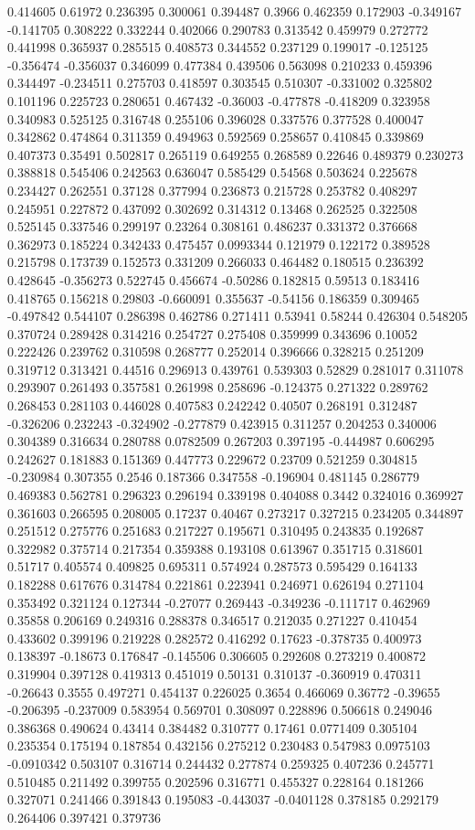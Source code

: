 0.414605 0.61972 0.236395 0.300061 0.394487 0.3966 0.462359 0.172903 -0.349167 -0.141705 0.308222 0.332244 0.402066 0.290783 0.313542 0.459979 0.272772 0.441998 0.365937 0.285515 0.408573 0.344552 0.237129 0.199017 -0.125125 -0.356474 -0.356037 0.346099 0.477384 0.439506 0.563098 0.210233 0.459396 0.344497 -0.234511 0.275703 0.418597 0.303545 0.510307 -0.331002 0.325802 0.101196 0.225723 0.280651 0.467432 -0.36003 -0.477878 -0.418209 0.323958 0.340983 0.525125 0.316748 0.255106 0.396028 0.337576 0.377528 0.400047 0.342862 0.474864 0.311359 0.494963 0.592569 0.258657 0.410845 0.339869 0.407373 0.35491 0.502817 0.265119 0.649255 0.268589 0.22646 0.489379 0.230273 0.388818 0.545406 0.242563 0.636047 0.585429 0.54568 0.503624 0.225678 0.234427 0.262551 0.37128 0.377994 0.236873 0.215728 0.253782 0.408297 0.245951 0.227872 0.437092 0.302692 0.314312 0.13468 0.262525 0.322508 0.525145 0.337546 0.299197 0.23264 0.308161 0.486237 0.331372 0.376668 0.362973 0.185224 0.342433 0.475457 0.0993344 0.121979 0.122172 0.389528 0.215798 0.173739 0.152573 0.331209 0.266033 0.464482 0.180515 0.236392 0.428645 -0.356273 0.522745 0.456674 -0.50286 0.182815 0.59513 0.183416 0.418765 0.156218 0.29803 -0.660091 0.355637 -0.54156 0.186359 0.309465 -0.497842 0.544107 0.286398 0.462786 0.271411 0.53941 0.58244 0.426304 0.548205 0.370724 0.289428 0.314216 0.254727 0.275408 0.359999 0.343696 0.10052 0.222426 0.239762 0.310598 0.268777 0.252014 0.396666 0.328215 0.251209 0.319712 0.313421 0.44516 0.296913 0.439761 0.539303 0.52829 0.281017 0.311078 0.293907 0.261493 0.357581 0.261998 0.258696 -0.124375 0.271322 0.289762 0.268453 0.281103 0.446028 0.407583 0.242242 0.40507 0.268191 0.312487 -0.326206 0.232243 -0.324902 -0.277879 0.423915 0.311257 0.204253 0.340006 0.304389 0.316634 0.280788 0.0782509 0.267203 0.397195 -0.444987 0.606295 0.242627 0.181883 0.151369 0.447773 0.229672 0.23709 0.521259 0.304815 -0.230984 0.307355 0.2546 0.187366 0.347558 -0.196904 0.481145 0.286779 0.469383 0.562781 0.296323 0.296194 0.339198 0.404088 0.3442 0.324016 0.369927 0.361603 0.266595 0.208005 0.17237 0.40467 0.273217 0.327215 0.234205 0.344897 0.251512 0.275776 0.251683 0.217227 0.195671 0.310495 0.243835 0.192687 0.322982 0.375714 0.217354 0.359388 0.193108 0.613967 0.351715 0.318601 0.51717 0.405574 0.409825 0.695311 0.574924 0.287573 0.595429 0.164133 0.182288 0.617676 0.314784 0.221861 0.223941 0.246971 0.626194 0.271104 0.353492 0.321124 0.127344 -0.27077 0.269443 -0.349236 -0.111717 0.462969 0.35858 0.206169 0.249316 0.288378 0.346517 0.212035 0.271227 0.410454 0.433602 0.399196 0.219228 0.282572 0.416292 0.17623 -0.378735 0.400973 0.138397 -0.18673 0.176847 -0.145506 0.306605 0.292608 0.273219 0.400872 0.319904 0.397128 0.419313 0.451019 0.50131 0.310137 -0.360919 0.470311 -0.26643 0.3555 0.497271 0.454137 0.226025 0.3654 0.466069 0.36772 -0.39655 -0.206395 -0.237009 0.583954 0.569701 0.308097 0.228896 0.506618 0.249046 0.386368 0.490624 0.43414 0.384482 0.310777 0.17461 0.0771409 0.305104 0.235354 0.175194 0.187854 0.432156 0.275212 0.230483 0.547983 0.0975103 -0.0910342 0.503107 0.316714 0.244432 0.277874 0.259325 0.407236 0.245771 0.510485 0.211492 0.399755 0.202596 0.316771 0.455327 0.228164 0.181266 0.327071 0.241466 0.391843 0.195083 -0.443037 -0.0401128 0.378185 0.292179 0.264406 0.397421 0.379736 